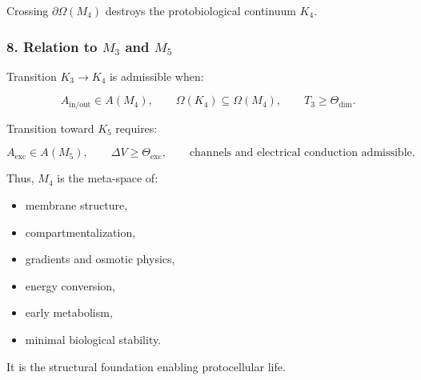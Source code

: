 Crossing $\partial\Omega(M_4)$ destroys the protobiological continuum $K_4$.

\subsubsection*{8. Relation to \texorpdfstring{$M_3$}{M_3} and \texorpdfstring{$M_5$}{M_5}}

Transition $K_3 \to K_4$ is admissible when:

\[
A_{\mathrm{in/out}} \in A(M_4),
\qquad
\Omega(K_4) \subseteq \Omega(M_4),
\qquad
T_3 \ge \Theta_{\mathrm{dim}}.
\]

Transition toward $K_5$ requires:

\[
A_{\mathrm{exc}} \in A(M_5),
\qquad
\Delta V \ge \Theta_{\mathrm{exc}},
\qquad
\text{channels and electrical conduction admissible}.
\]

Thus, $M_4$ is the meta-space of:

\begin{itemize}
    \item membrane structure,
    \item compartmentalization,
    \item gradients and osmotic physics,
    \item energy conversion,
    \item early metabolism,
    \item minimal biological stability.
\end{itemize}

It is the structural foundation enabling protocellular life.
